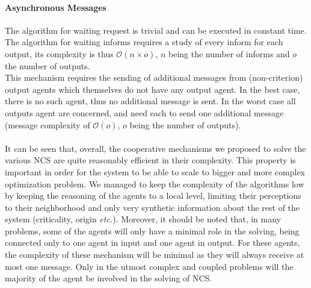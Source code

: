 \paragraph*{Asynchronous Messages}

The algorithm for waiting request is trivial and can be executed in constant time. The algorithm for waiting informs requires a study of every inform for each output, its complexity is thus $\mathcal{O}(n \times o)$, $n$ being the number of informs and $o$ the number of outputs.\\
This mechanism requires the sending of additional messages from (non-criterion) output agents which themselves do not have any output agent. In the best case, there is no such agent, thus no additional message is sent. In the worst case all outputs agent are concerned, and need each to send one additional message (message complexity of $\mathcal{O}(o)$, $o$ being the number of outputs).

\paragraph*{}
It can  be seen that, overall, the cooperative mechanisms we proposed to solve the various NCS are quite reasonably efficient in their complexity. This property is important in order for the system to be able to scale to bigger and more complex optimization problem. We managed to keep the complexity of the algorithms low by keeping the reasoning of the agents to a local level, limiting their perceptions to their neighborhood and only very synthetic information about the rest of the system (criticality, origin \emph{etc.}). Moreover, it should be noted that, in many problems, some of the agents will only have a minimal role in the solving, being connected only to one agent in input and one agent in output. For these agents, the complexity of these mechanism will be minimal as they will always receive at most one message. Only in the utmost complex and coupled problems will the majority of the agent be involved in the solving of NCS.

